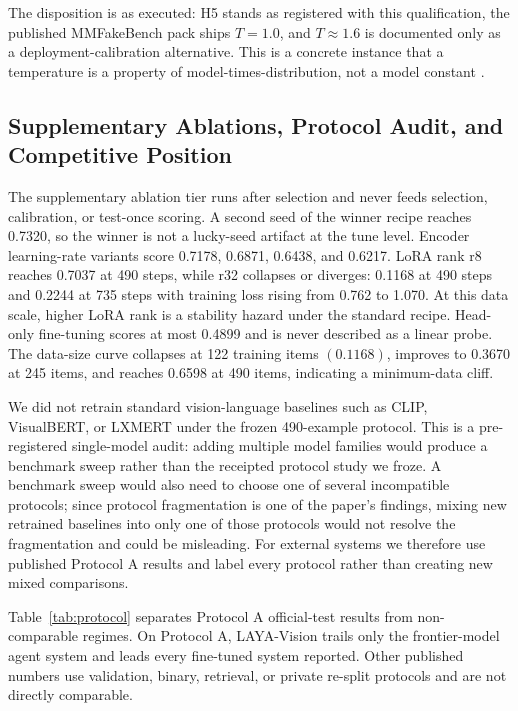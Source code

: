 \documentclass{article} %
\begin{document}
The disposition is as executed: H5 stands as registered with this qualification, the published MMFakeBench pack ships \(T=1.0\), and \(T\approx1.6\) is documented only as a deployment-calibration alternative. This is a concrete instance that a temperature is a property of model-times-distribution, not a model constant \citep{Guo2017CalibrationModern, Ovadia2019CanYou, Minderer2021RevisitingCalibration}.

\subsection{Supplementary Ablations, Protocol Audit, and Competitive Position}
The supplementary ablation tier runs after selection and never feeds selection, calibration, or test-once scoring. A second seed of the winner recipe reaches 0.7320, so the winner is not a lucky-seed artifact at the tune level. Encoder learning-rate variants score 0.7178, 0.6871, 0.6438, and 0.6217. LoRA rank r8 reaches 0.7037 at 490 steps, while r32 collapses or diverges: 0.1168 at 490 steps and 0.2244 at 735 steps with training loss rising from 0.762 to 1.070. At this data scale, higher LoRA rank is a stability hazard under the standard recipe. Head-only fine-tuning scores at most 0.4899 and is never described as a linear probe. The data-size curve collapses at 122 training items \((0.1168)\), improves to 0.3670 at 245 items, and reaches 0.6598 at 490 items, indicating a minimum-data cliff.

We did not retrain standard vision-language baselines such as CLIP, VisualBERT, or LXMERT under the frozen 490-example protocol. This is a pre-registered single-model audit: adding multiple model families would produce a benchmark sweep rather than the receipted protocol study we froze. A benchmark sweep would also need to choose one of several incompatible protocols; since protocol fragmentation is one of the paper's findings, mixing new retrained baselines into only one of those protocols would not resolve the fragmentation and could be misleading. For external systems we therefore use published Protocol A results and label every protocol rather than creating new mixed comparisons.

Table~\ref{tab:protocol} separates Protocol A official-test results from non-comparable regimes. On Protocol A, LAYA-Vision trails only the frontier-model agent system and leads every fine-tuned system reported. Other published numbers use validation, binary, retrieval, or private re-split protocols and are not directly comparable.
\end{document}
